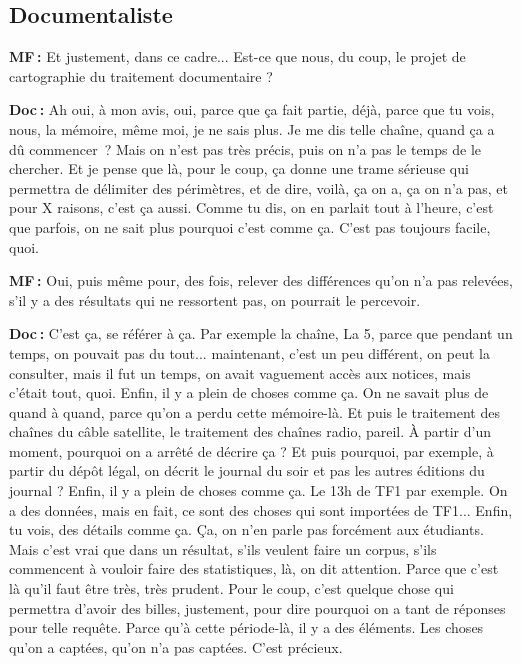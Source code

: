 \subsection*{Documentaliste} 

\textbf{MF :} Et justement, dans ce cadre...  Est-ce que nous, du coup, le projet de cartographie du traitement documentaire ?  

\textbf{Doc :} Ah oui, à mon avis, oui, parce que ça fait partie, déjà, parce que tu vois, nous, la mémoire, même moi, je ne sais plus. Je me dis telle chaîne, quand ça a dû commencer ? Mais on n'est pas très précis, puis on n'a pas le temps de le chercher.  Et je pense que là, pour le coup, ça donne une trame sérieuse qui permettra de délimiter des périmètres, et de dire, voilà, ça on a, ça on n'a pas, et pour X raisons, c'est ça aussi. Comme tu dis, on en parlait tout à l'heure, c'est que parfois, on ne sait plus pourquoi c'est comme ça. C'est pas toujours facile, quoi.

\textbf{MF :} Oui, puis même pour, des fois, relever des différences qu'on n'a pas relevées, s'il y a des résultats qui ne ressortent pas, on pourrait le percevoir.   

\textbf{Doc :} C'est ça, se référer à ça. Par exemple la chaîne, La 5, parce que pendant un temps, on pouvait pas du tout... maintenant, c'est un peu différent, on peut la consulter, mais il fut un temps, on avait vaguement accès aux notices, mais c'était tout, quoi. Enfin, il y a plein de choses comme ça.  On ne savait plus de quand à quand, parce qu'on a perdu cette mémoire-là.  Et puis le traitement des chaînes du câble satellite, le traitement des chaînes radio, pareil. À partir d’un moment, pourquoi on a arrêté de décrire ça ? Et puis pourquoi, par exemple, à partir du dépôt légal, on décrit le journal du soir et pas les autres éditions du journal ? Enfin, il y a plein de choses comme ça. Le 13h de TF1 par exemple. On a des données, mais en fait, ce sont des choses qui sont importées de TF1... Enfin, tu vois, des détails comme ça. Ça, on n’en parle pas forcément aux étudiants.  Mais c'est vrai que dans un résultat, s'ils veulent faire un corpus, s'ils commencent à vouloir faire des statistiques, là, on dit attention. Parce que c'est là qu'il faut être très, très prudent. Pour le coup, c'est quelque chose qui permettra d'avoir des billes, justement, pour dire pourquoi on a tant de réponses pour telle requête. Parce qu'à cette période-là, il y a des éléments. Les choses qu'on a captées, qu'on n'a pas captées. C'est précieux.

